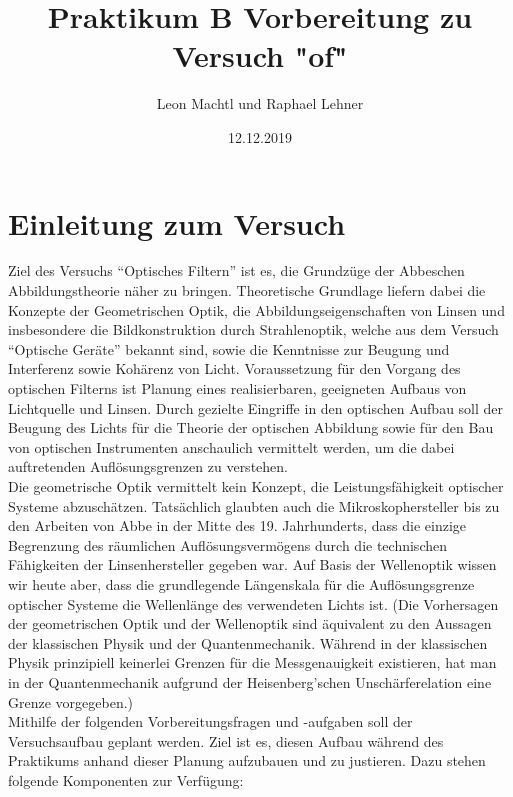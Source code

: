 \documentclass[a4paper,10pt]{scrartcl}
\title{Praktikum B Vorbereitung zu Versuch "of"}
\author{Leon Machtl und Raphael Lehner}
\date{12.12.2019}
\begin{document}
	\maketitle
	\tableofcontents
	\newpage
	
	\section{Einleitung zum Versuch}
Ziel des Versuchs ``Optisches Filtern'' ist es, die Grundzüge der Abbeschen Abbildungstheorie näher zu bringen. Theoretische Grundlage liefern dabei die Konzepte der Geometrischen Optik, die Abbildungseigenschaften von Linsen und insbesondere die Bildkonstruktion durch Strahlenoptik, welche aus dem Versuch ``Optische Geräte'' bekannt sind, sowie die Kenntnisse zur Beugung und Interferenz sowie Kohärenz von Licht. Voraussetzung für den Vorgang des optischen Filterns ist Planung eines realisierbaren, geeigneten Aufbaus von Lichtquelle und Linsen. Durch gezielte Eingriffe in den optischen Aufbau soll der Beugung des Lichts für die Theorie der optischen Abbildung sowie für den Bau von optischen Instrumenten anschaulich vermittelt werden, um die dabei auftretenden Auflösungsgrenzen zu verstehen.\\
	Die geometrische Optik vermittelt kein Konzept, die Leistungsfähigkeit optischer Systeme abzuschätzen. Tatsächlich glaubten auch die Mikroskophersteller bis zu den Arbeiten von Abbe in der Mitte des 19. Jahrhunderts, dass die einzige Begrenzung des räumlichen Auflösungsvermögens durch die technischen Fähigkeiten der Linsenhersteller gegeben war. Auf Basis der Wellenoptik wissen wir heute aber, dass die grundlegende Längenskala für die Auflösungsgrenze optischer Systeme die Wellenlänge des verwendeten Lichts ist. (Die Vorhersagen der geometrischen Optik und der Wellenoptik sind äquivalent zu den Aussagen der klassischen Physik und der Quantenmechanik. Während in der klassischen Physik prinzipiell keinerlei Grenzen für die Messgenauigkeit existieren, hat man in der Quantenmechanik aufgrund der Heisenberg'schen Unschärferelation eine Grenze vorgegeben.)\\
	Mithilfe der folgenden Vorbereitungsfragen und -aufgaben soll der Versuchsaufbau geplant werden. Ziel ist es, diesen Aufbau während des Praktikums anhand dieser Planung aufzubauen und zu justieren. Dazu stehen folgende Komponenten zur Verfügung:\\
\end{document}
